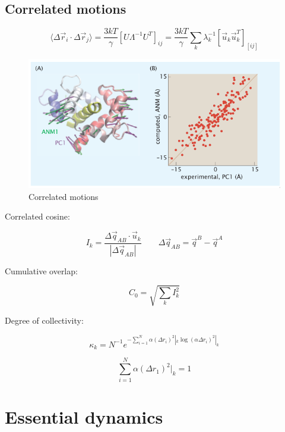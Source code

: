 	\subsection{Correlated motions}

	$$\langle\Delta\vec{r}_i\cdot\Delta\vec{r}_j\rangle = \frac{3kT}{\gamma}[U\Lambda^{-1}U^T]_{ij} = \frac{3kT}{\gamma}\sum\limits_{k}\lambda_k^{-1}[\vec{u}_k\vec{u}_k^T]_[ij]$$

	\begin{figure}[H]
		\includegraphics[width=\textwidth]{asm-correlated-motion}
		\caption{Correlated motions}
		\label{fig:as-correlated-motion}
	\end{figure}

	Correlated cosine:

	$$I_k = \frac{\Delta\vec{q}_{AB}\cdot\vec{u}_k}{|\Delta\vec{q}_{AB}|}\qquad \Delta\vec{q}_{AB} = \vec{q}^B-\vec{q}^A$$

	Cumulative overlap:

	$$C_0 = \sqrt{\sum\limits_k I_k^2}$$

	Degree of collectivity:

	$$\kappa_k = N^{-1}e^{-\sum\limits_{i=1}^N\alpha(\Delta r_i)^2|_k\log(\alpha\Delta r_i)^2|_k}$$

	$$\sum\limits_{i=1}^N\alpha(\Delta r_1)^2|_k = 1$$

\section{Essential dynamics}

